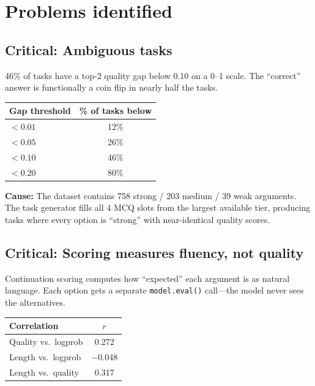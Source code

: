 \documentclass[11pt,a4paper]{article}
\begin{document}
\section{Problems identified}

\subsection{\textcolor{crit}{Critical:} Ambiguous tasks}

46\% of tasks have a top-2 quality gap below 0.10 on a 0--1 scale. The ``correct'' answer is functionally a coin flip in nearly half the tasks.

\begin{table}[h]
\centering
\small
\begin{tabular}{@{}lc@{}}
\toprule
Gap threshold & \% of tasks below \\
\midrule
$< 0.01$ & 12\% \\
$< 0.05$ & 26\% \\
$< 0.10$ & 46\% \\
$< 0.20$ & 80\% \\
\bottomrule
\end{tabular}
\end{table}

\textbf{Cause:} The dataset contains 758 strong / 203 medium / 39 weak arguments. The task generator fills all 4 MCQ slots from the largest available tier, producing tasks where every option is ``strong'' with near-identical quality scores.

\subsection{\textcolor{crit}{Critical:} Scoring measures fluency, not quality}

Continuation scoring computes how ``expected'' each argument is as natural language. Each option gets a separate \texttt{model.eval()} call---the model never sees the alternatives.

\begin{table}[h]
\centering
\small
\begin{tabular}{@{}lc@{}}
\toprule
Correlation & $r$ \\
\midrule
Quality vs.\ logprob & 0.272 \\
Length vs.\ logprob  & $-0.048$ \\
Length vs.\ quality  & 0.317 \\
\bottomrule
\end{tabular}
\end{table}
\end{document}
